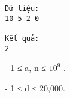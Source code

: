 \begin{verbatim}
Dữ liệu:
10 5 2 0

Kết quả:
2
\end{verbatim}
- 1 ≤ a, n ≤ $10^{9}$   .   


   - 1 ≤ d ≤ 20,000.